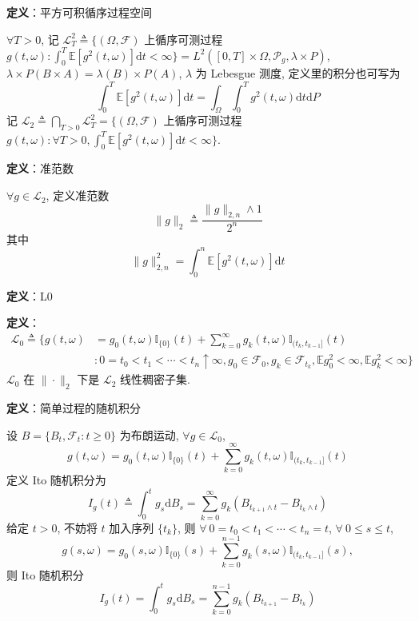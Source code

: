 \documentclass[openany]{ctexbook}
\theoremstyle{kaiti}
\theoremstyle{normal}
\begin{document}
\textbf{定义}：平方可积循序过程空间

$\forall T>0$, 记 $\mathcal{L}_T^2\triangleq\bigg\{(\Omega,\mathcal{F})$ 上循序可测过程 $g(t,\omega): \displaystyle\int_0^T\mathbb{E}[g^2(t,\omega)]\mathrm{d}t<\infty\bigg\}=L^2([0,T]\times\Omega,\mathcal{P}_g,\lambda\times P)$, $\lambda\times P(B\times A)=\lambda(B)\times P(A)$, $\lambda$ 为 Lebesgue 测度, 定义里的积分也可写为
\begin{equation}
  \int_0^T\mathbb{E}[g^2(t,\omega)]\mathrm{d}t=\int_\Omega\int_0^Tg^2(t,\omega)\mathrm{d}t\mathrm{d}P
\end{equation}
 记 $\mathcal{L}_2\triangleq\bigcap\limits_{T>0}\mathcal{L}_T^2=\bigg\{(\Omega,\mathcal{F})$ 上循序可测过程 $g(t,\omega): \forall T>0, \displaystyle\int_0^T\mathbb{E}[g^2(t,\omega)]\mathrm{d}t<\infty\bigg\}$.

\textbf{定义}：准范数

$\forall g\in\mathcal{L}_2$, 定义准范数
\begin{equation}
  \|g\|_2\triangleq\frac{\|g\|_{2,n}\wedge1}{2^n}
\end{equation}
 其中
\begin{equation}
  \|g\|_{2,n}^2=\int_0^n\mathbb{E}[g^2(t,\omega)]\mathrm{d}t
\end{equation}


\textbf{定义}：L0

\textbf{定义}：\begin{equation}\begin{aligned}\mathcal{L}_0\triangleq\Bigg\{g(t,\omega)&=g_0(t,\omega)\mathbb{I}_{\{0\}}(t)+\sum_{k=0}^\infty g_k(t,\omega)\mathbb{I}_{(t_k,t_{k-1}]}(t)\\&:0=t_0<t_1<\cdots<t_n\uparrow\infty,g_0\in\mathcal{F}_0,g_k\in\mathcal{F}_{t_k},\mathbb{E}g_0^2<\infty,\mathbb{E}g_k^2<\infty\Bigg\}\end{aligned}\end{equation} $\mathcal{L}_0$ 在 $\|\cdot\|_2$ 下是 $\mathcal{L}_2$ 线性稠密子集.

\textbf{定义}：简单过程的随机积分

设 $B=\{B_t,\mathcal{F}_t:t\geqslant0\}$ 为布朗运动, $\forall g\in\mathcal{L}_0$,
\begin{equation}
  g(t,\omega)=g_0(t,\omega)\mathbb{I}_{\{0\}}(t)+\sum_{k=0}^\infty g_k(t,\omega)\mathbb{I}_{(t_k,t_{k-1}]}(t)
\end{equation}
 定义 Ito 随机积分为
\begin{equation}
  I_g(t)\triangleq\int_0^tg_s\mathrm{d}B_s=\sum_{k=0}^\infty g_k(B_{t_{k+1}\wedge t}-B_{t_{k}\wedge t})
\end{equation}
 给定 $t>0$, 不妨将 $t$ 加入序列 $\{t_k\}$, 则 $\forall~ 0=t_0<t_1<\cdots<t_n=t$, $\forall~ 0\leqslant s\leqslant t$,
\begin{equation}
  g(s,\omega)=g_0(s,\omega)\mathbb{I}_{\{0\}}(s)+\sum_{k=0}^{n-1} g_k(s,\omega)\mathbb{I}_{(t_k,t_{k-1}]}(s),
\end{equation}
 则 Ito 随机积分
\begin{equation}
  I_g(t)=\int_0^tg_s\mathrm{d}B_s=\sum_{k=0}^{n-1}g_k(B_{t_{k+1}}-B_{t_k})
\end{equation}
\end{document}

